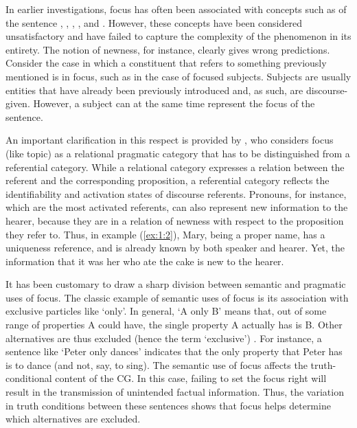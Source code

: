 In earlier investigations, focus has often been associated with concepts such as  of the sentence \parencite{bolinger1985two}, , , , and  \parencite{halliday_1967}. However, these concepts have been considered unsatisfactory and have failed to capture the complexity of the phenomenon in its entirety. The notion of newness, for instance, clearly gives wrong predictions. Consider the case in which a constituent that refers to something previously mentioned is in focus, such as in the case of focused subjects. Subjects are usually entities that have already been previously introduced and, as such, are discourse-given. However, a subject can at the same time represent the focus of the sentence.

An important clarification in this respect is provided by \textcite{lambrecht1996information}, who considers focus (like topic) as a relational pragmatic category that has to be distinguished from a referential category. While a relational category expresses a relation between the referent and the corresponding proposition, a referential category reflects the identifiability and activation states of discourse referents. Pronouns, for instance, which are the most activated referents, can also represent new information to the hearer, because they are in a relation of newness with respect to the proposition they refer to. Thus, in example (\ref{ex:1:2}), Mary, being a proper name, has a uniqueness reference, and is already known by both speaker and hearer. Yet, the information that it was her who ate the cake is new to the hearer.

It has been customary to draw a sharp division between semantic and pragmatic uses of focus. The classic example of semantic uses of focus is its association with exclusive particles like `only’. In general, ‘A only B’ means that, out of some range of properties A could have, the single property A actually has is B. Other alternatives are thus excluded (hence the term ‘exclusive’) \parencite{velleman2016question}. For instance, a sentence like `Peter only dances' indicates that the only property that Peter has is to dance (and not, say, to sing).
The semantic use of focus affects the truth-conditional content of the CG. In this case, failing to set the focus right will result in the transmission of unintended factual information. Thus, the variation in truth conditions between these sentences shows that focus helps determine which alternatives are excluded.

